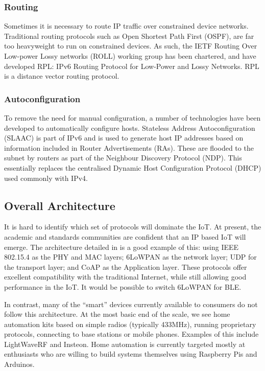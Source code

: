 \documentclass[10pt,journal,compsoc]{IEEEtran}
\begin{document}
\subsubsection{Routing}
Sometimes it is necessary to route IP traffic over constrained device networks.
Traditional routing protocols such as Open Shortest Path First (OSPF), are far
too heavyweight to run on constrained devices. As such, the IETF Routing Over
Low-power Lossy networks (ROLL) working group has been chartered, and have
developed RPL: IPv6 Routing Protocol for Low-Power and Lossy Networks. RPL is a
distance vector routing protocol.

\subsubsection{Autoconfiguration}
To remove the need for manual configuration, a number of technologies have been
developed to automatically configure hosts. Stateless Address Autoconfiguration
(SLAAC) is part of IPv6 and is used to generate host IP addresses based on
information included in Router Advertisements (RAs). These are flooded to the
subnet by routers as part of the Neighbour Discovery Protocol (NDP). This
essentially replaces the centralised Dynamic Host Configuration Protocol (DHCP)
used commonly with IPv4. 

\subsection{Overall Architecture}
It is hard to identify which set of protocols will dominate the IoT. At
present, the academic and standards communities are confident that an IP based
IoT will emerge. The architecture detailed in \cite{Palattella2013} is a good
example of this: using IEEE 802.15.4 as the PHY and MAC layers; 6LoWPAN as the
network layer; UDP for the transport layer; and CoAP as the Application layer.
These protocols offer excellent compatibility with the traditional Internet,
while still allowing good performance in the IoT. It would be possible to
switch 6LoWPAN for BLE. 

In contrast, many of the ``smart'' devices currently available to consumers do
not follow this architecture. At the most basic end of the scale, we see home
automation kits based on simple radios (typically 433MHz), running proprietary
protocols, connecting to base stations or mobile phones. Examples of this
include LightWaveRF and Insteon. Home automation is currently targeted mostly
at enthusiasts who are willing to build systems themselves using Raspberry Pis
and Arduinos.
\end{document}
